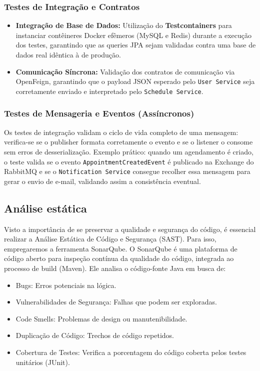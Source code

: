 \documentclass[
    12pt, 
    a4paper, 
    oneside, 
    chapter=TITLE, 
    section=TITLE
]{abntex2}
\begin{document}
\subsubsection{Testes de Integração e Contratos}
\begin{itemize}
    \item \textbf{Integração de Base de Dados:} Utilização do \textbf{Testcontainers} para instanciar contêineres Docker efêmeros (MySQL e Redis) durante a execução dos testes, garantindo que as queries JPA sejam validadas contra uma base de dados real idêntica à de produção.
    \item \textbf{Comunicação Síncrona:} Validação dos contratos de comunicação via OpenFeign, garantindo que o payload JSON esperado pelo \texttt{User Service} seja corretamente enviado e interpretado pelo \texttt{Schedule Service}.
\end{itemize}

\subsubsection{Testes de Mensageria e Eventos (Assíncronos)}
Os testes de integração validam o ciclo de vida completo de uma mensagem: verifica-se se o publisher formata corretamente o evento e se o listener o consome sem erros de desserialização. Exemplo prático: quando um agendamento é criado, o teste valida se o evento \texttt{AppointmentCreatedEvent} é publicado na Exchange do RabbitMQ e se o \texttt{Notification Service} consegue recolher essa mensagem para gerar o envio de e-mail, validando assim a consistência eventual.

\subsection{Análise estática}
Visto a importância de se preservar a qualidade e segurança do código, é essencial realizar a Análise Estática de Código e Segurança (SAST). Para isso, empregaremos a ferramenta SonarQube. O SonarQube é uma plataforma de código aberto para inspeção contínua da qualidade do código, integrada ao processo de build (Maven). Ele analisa o código-fonte Java em busca de:
\begin{itemize}
    \item Bugs: Erros potenciais na lógica.
    \item Vulnerabilidades de Segurança: Falhas que podem ser exploradas.
    \item Code Smells: Problemas de design ou manutenibilidade.
    \item Duplicação de Código: Trechos de código repetidos.
    \item Cobertura de Testes: Verifica a porcentagem do código coberta pelos testes unitários (JUnit).
\end{itemize}
\end{document}
